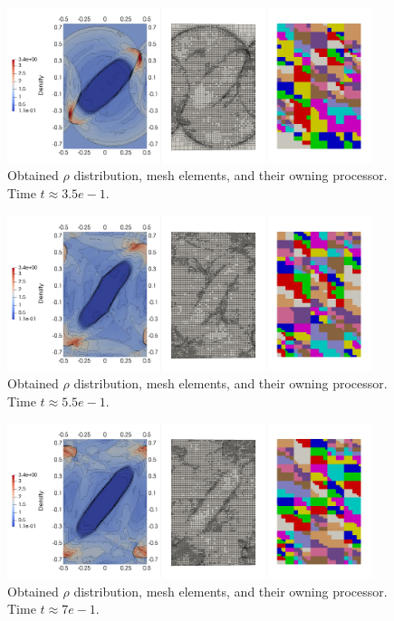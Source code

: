 \begin{figure}[H]
	\begin{center}
		\includegraphics[width=0.95\textwidth]{img/mhd-blast/new/adapt-full6.jpg}
\vspace{-3mm}
	\caption{Obtained $\rho$ distribution, mesh elements, and their owning processor. Time $t\approx 3.5e-1$.}
	\label{figure:amrBlast5}
	\end{center}
\end{figure}
\vspace{-10mm}

\begin{figure}[H]
	\begin{center}
		\includegraphics[width=0.95\textwidth]{img/mhd-blast/new/adapt-full10.jpg}
\vspace{-3mm}
	\caption{Obtained $\rho$ distribution, mesh elements, and their owning processor. Time $t\approx 5.5e-1$.}
	\label{figure:amrBlast6}
	\end{center}
\end{figure}
\vspace{-10mm}


\begin{figure}[H]
	\begin{center}
		\includegraphics[width=0.95\textwidth]{img/mhd-blast/new/adapt-full13.jpg}
\vspace{-3mm}
	\caption{Obtained $\rho$ distribution, mesh elements, and their owning processor. Time $t\approx 7e-1$.}
	\label{figure:amrBlast7}
	\end{center}
\end{figure}
\vspace{-10mm}


